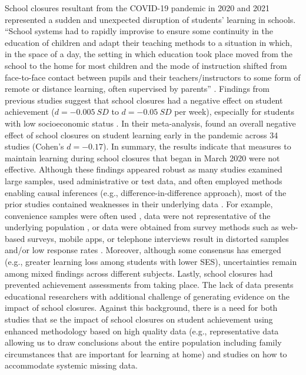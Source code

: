 School closures resultant from the COVID-19 pandemic in 2020 and 2021 represented a sudden and unexpected disruption of students' learning in schools. ``School systems had to rapidly improvise to ensure some continuity in the education of children and adapt their teaching methods to a situation in which, in the space of a day, the setting in which education took place moved from the school to the home for most children and the mode of instruction shifted from face-to-face contact between pupils and their teachers/instructors to some form of remote or distance learning, often supervised by parents'' \parencite[][p. 13]{thorn:2021}. Findings from previous studies suggest that school closures had a negative effect on student achievement ($d=-0.005\ SD$ to $d=-0.05\ SD$ per week), especially for students with low socioeconomic status \parencite{hammerstein:2021}. In their meta-analysis, \textcite{betthauser:2022} found an overall negative effect of school closures on student learning early in the pandemic across 34 studies (Cohen's $d=-0.17$). In summary, the results indicate that measures to maintain learning during school closures that began in March 2020 were not effective. Although these findings appeared robust as many studies examined large samples, used administrative or test data, and often employed methods enabling causal inferences (e.g., difference-in-difference approach), most of the prior studies contained weaknesses in their underlying data \parencite{thorn:2021}. For example, convenience samples were often used \parencite[e.g., ][]{clark:2021}, data were not representative of the underlying population \parencite[e.g., ][]{kuhfeld:2020}, or data were obtained from survey methods such as web-based surveys, mobile apps, or telephone interviews result in distorted samples and/or low response rates \parencite[e.g., ][]{vandervelde:2021}. Moreover, although some consensus has emerged (e.g., greater learning loss among students with lower SES), uncertainties remain among mixed findings across different subjects. Lastly, school closures had prevented achievement assessments from taking place. The lack of data presents educational researchers with additional challenge of generating evidence on the impact of school closures. Against this background, there is a need for both studies that se the impact of school closures on student achievement using enhanced methodology based on high quality data (e.g., representative data allowing us to draw conclusions about the entire population including family circumstances that are important for learning at home) and studies on how to accommodate systemic missing data.

